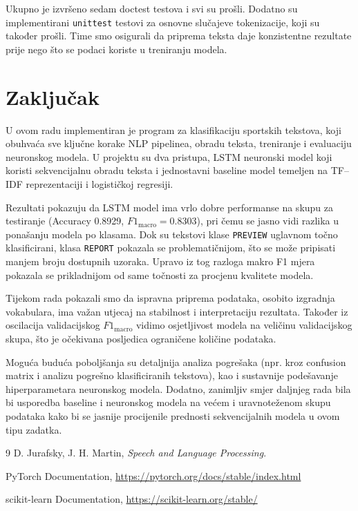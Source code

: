 \documentclass[12pt,a4paper]{article}
\begin{document}
Ukupno je izvršeno sedam doctest testova i svi su prošli. Dodatno su implementirani
\texttt{unittest} testovi za osnovne slučajeve tokenizacije, koji su također prošli. Time smo osigurali da priprema teksta daje konzistentne rezultate prije nego
što se podaci koriste u treniranju modela.


\newpage

\section{Zaključak}
U ovom radu implementiran je program za klasifikaciju sportskih tekstova, koji
obuhvaća sve ključne korake NLP pipelinea, obradu teksta, treniranje i evaluaciju
neuronskog modela. U projektu su dva pristupa, LSTM neuronski model koji koristi
sekvencijalnu obradu teksta i jednostavni baseline model temeljen
na TF--IDF reprezentaciji i logističkoj regresiji.

Rezultati pokazuju da LSTM model ima vrlo dobre performanse na skupu za testiranje
(Accuracy 0.8929, $F1_{\mathrm{macro}} = 0.8303$), pri čemu se jasno vidi razlika u
ponašanju modela po klasama. Dok su tekstovi klase \texttt{PREVIEW} uglavnom točno
klasificirani, klasa \texttt{REPORT} pokazala se problematičnijom, što se može pripisati
manjem broju dostupnih uzoraka. Upravo iz tog razloga makro F1 mjera pokazala se
prikladnijom od same točnosti za procjenu kvalitete modela.

Tijekom rada pokazali smo da ispravna priprema podataka, osobito izgradnja vokabulara, ima važan utjecaj na stabilnost i interpretaciju
rezultata. Također iz oscilacija validacijskog $F1_{\mathrm{macro}}$ vidimo osjetljivost
modela na veličinu validacijskog skupa, što je očekivana posljedica ograničene količine podataka.

Moguća buduća poboljšanja su detaljnija analiza pogrešaka (npr. kroz confusion
matrix i analizu pogrešno klasificiranih tekstova), kao i sustavnije podešavanje
hiperparametara neuronskog modela. Dodatno, zanimljiv smjer daljnjeg rada bila bi
usporedba baseline i neuronskog modela na većem i uravnoteženom skupu podataka kako
bi se jasnije procijenile prednosti sekvencijalnih modela u ovom tipu zadatka.


\newpage

\begin{thebibliography}{9}
D. Jurafsky, J. H. Martin,
\textit{Speech and Language Processing}.

PyTorch Documentation, \url{https://pytorch.org/docs/stable/index.html}

scikit-learn Documentation, \url{https://scikit-learn.org/stable/}
\end{thebibliography}
\end{document}
